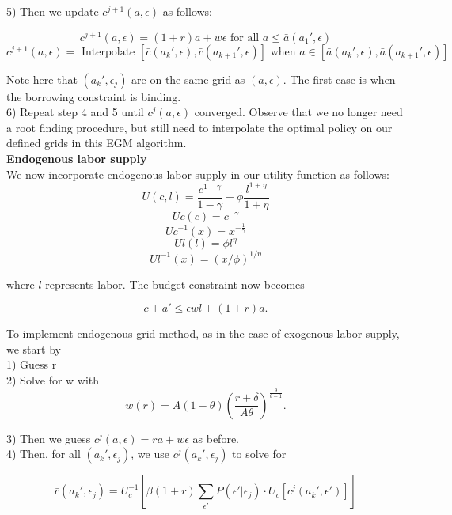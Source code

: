 \documentclass{article}
\begin{document}
	5) Then we update $c^{j+1}(a,\epsilon)$ as follows:
		
		$$c^{j+1}(a,\epsilon) = (1+r)a + w \epsilon  \text{ for all } a \leq \bar{a}(a_{1}', \epsilon)$$
		$$c^{j+1}(a,\epsilon) = \text{ Interpolate } [\bar{c}(a_{k}', \epsilon), \bar{c}(a_{k+1}', \epsilon)] \text{ when } a \in [\bar{a}(a_{k}', \epsilon), \bar{a}(a_{k+1}', \epsilon)]$$
		
		Note here that $(a_{k}', \epsilon_{j})$ are on the same grid as $(a,\epsilon)$. The first case is when the borrowing constraint is binding.  \\
		
	6) Repeat step 4 and 5 until $c^{j}(a,\epsilon)$ converged. Observe that we no longer need a root finding procedure, but still need to interpolate the optimal policy on our defined grids in this EGM algorithm. \\
		
	 
	
	\noindent\textbf{\Large Endogenous labor supply} \\
	
		We now incorporate endogenous labor supply in our utility function as follows:
		$$U(c,l) =  \frac{c^{1-\gamma}}{1-\gamma} - \phi\frac{l^{1+\eta}}{1+\eta}$$
		$$Uc(c) = c^{-\gamma}$$
		$$Uc^{-1}(x) = x^{-\frac{1}{\gamma}}$$
		$$Ul(l) = \phi l^\eta$$
		$$Ul^{-1}(x) = (x/\phi)^{1/\eta}$$
		
		where $l$ represents labor. The budget constraint now becomes
		
		$$c+a' \leq \epsilon w l + (1 + r)a.$$
		
		To implement endogenous grid method, as in the case of exogenous labor supply, we start by \\ 
		
		1) Guess r \\
		
		2) Solve for w with \\
		
		$$w(r) = A(1-\theta)\left(\frac{r+\delta}{A\theta}\right)^{\frac{\theta}{\theta-1}}. $$
		
		3) Then we guess $c^{j}(a,\epsilon) = ra + w\epsilon$ as before. \\
		
		4) Then, for all $(a_{k}',\epsilon_{j})$, we use $c^{j}(a_{k}',\epsilon_{j})$ to solve for 
		
		$$\bar{c}(a_{k}', \epsilon_{j}) = U_{c}^{-1}\left[ \beta (1+r) \sum_{\epsilon'}P(\epsilon'|\epsilon_{j}) \cdot U_{c}\left[ c^{j}(a_{k}',\epsilon') \right] \right]$$
		
\end{document}
